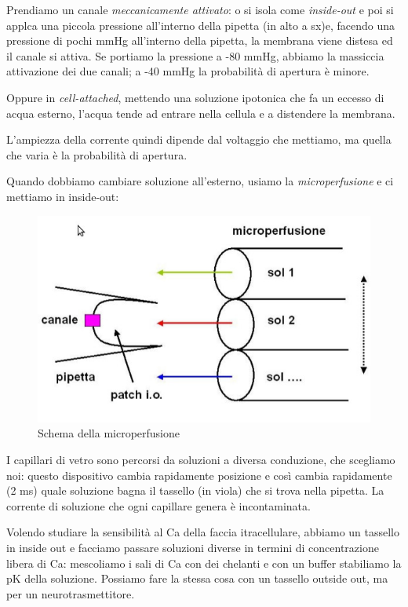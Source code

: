 \documentclass[a4paper,12pt]{article}
\begin{document}
Prendiamo un canale \emph{meccanicamente attivato}: o si isola come \emph{inside-out} e poi si applca una piccola pressione all'interno della pipetta (in alto a sx)e, facendo una pressione di pochi mmHg all'interno della pipetta, la membrana viene distesa ed il canale si attiva. Se portiamo la pressione a -80 mmHg, abbiamo la massiccia attivazione dei due canali; a -40 mmHg la probabilità di apertura è minore.

Oppure in \emph{cell-attached}, mettendo una soluzione ipotonica che fa un eccesso di acqua esterno, l'acqua tende ad entrare nella cellula e a distendere la membrana.

L'ampiezza della corrente quindi dipende dal voltaggio che mettiamo, ma quella che varia è la probabilità di apertura.

Quando dobbiamo cambiare soluzione all'esterno, usiamo la \emph{microperfusione} e ci mettiamo in inside-out:

\begin{figure}[H]
\centering
\includegraphics[scale=0.4]{immagine/microperfusione.jpg}
\caption{Schema della microperfusione}
\end{figure} 

I capillari di vetro sono percorsi da soluzioni a diversa conduzione, che scegliamo noi: questo dispositivo cambia rapidamente posizione e così cambia rapidamente (2 ms) quale soluzione bagna il tassello (in viola) che si trova nella pipetta. La corrente di soluzione che ogni capillare genera è incontaminata. 

Volendo studiare la sensibilità al Ca della faccia itracellulare, abbiamo un tassello in inside out e facciamo passare soluzioni diverse in termini di concentrazione libera di Ca: mescoliamo i sali di Ca con dei chelanti e con un buffer stabiliamo la pK della soluzione. Possiamo fare la stessa cosa con un tassello outside out, ma per un neurotrasmettitore.
\end{document}
